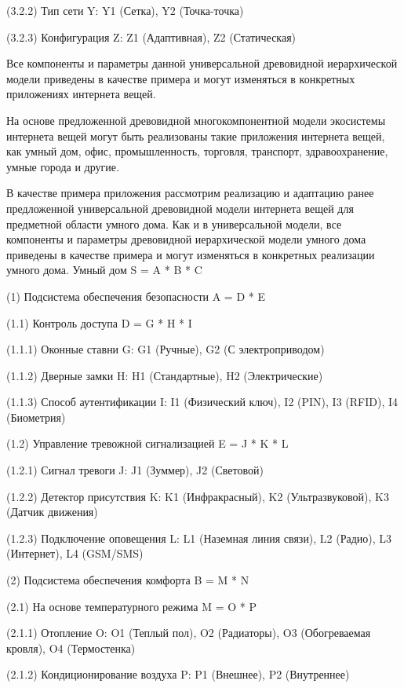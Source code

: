 (3.2.2) Тип сети Y: Y1 (Сетка), Y2 (Точка-точка)

(3.2.3) Конфигурация Z: Z1 (Адаптивная), Z2 (Статическая)

Все компоненты и параметры данной универсальной древовидной иерархической модели приведены в качестве примера и могут изменяться в конкретных приложениях интернета вещей.

На основе предложенной древовидной многокомпонентной модели экосистемы интернета вещей могут быть реализованы такие приложения интернета вещей, как умный дом, офис, промышленность, торговля, транспорт, здравоохранение, умные города и другие.

В качестве примера приложения рассмотрим реализацию и адаптацию ранее предложенной универсальной древовидной модели интернета вещей для предметной области умного дома. Как и в универсальной модели, все компоненты и параметры древовидной иерархической модели умного дома приведены в качестве примера и могут изменяться в конкретных реализации умного дома.
Умный дом S = A * B * C

(1) Подсистема обеспечения безопасности A = D * E

(1.1) Контроль доступа D = G * H * I

(1.1.1) Оконные ставни G: G1 (Ручные), G2 (С электроприводом)

(1.1.2) Дверные замки H: H1 (Стандартные), H2 (Электрические)

(1.1.3) Способ аутентификации I: I1 (Физический ключ), I2 (PIN), I3 (RFID), I4 (Биометрия)

(1.2) Управление тревожной сигнализацией E = J * K * L

(1.2.1) Сигнал тревоги J: J1 (Зуммер), J2 (Световой)

(1.2.2) Детектор присутствия K: K1 (Инфракрасный), K2 (Ультразвуковой), K3 (Датчик движения)

(1.2.3) Подключение оповещения L: L1 (Наземная линия связи), L2 (Радио), L3 (Интернет), L4 (GSM/SMS)

(2) Подсистема обеспечения комфорта B = M * N

(2.1) На основе температурного режима M = O * P

(2.1.1) Отопление O: O1 (Теплый пол), O2 (Радиаторы), O3 (Обогреваемая кровля), O4 (Термостенка)

(2.1.2) Кондиционирование воздуха P: P1 (Внешнее), P2 (Внутреннее)

